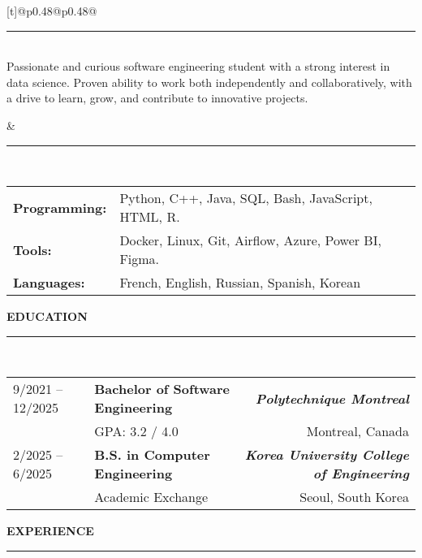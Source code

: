 \documentclass[a4paper,10pt]{article}
\begin{document}
\noindent
\begin{tabularx}{\textwidth}[t]{@{}p{0.48\textwidth}@{\hspace{2em}}p{0.48\textwidth}@{}}
  \parbox[t]{\linewidth}{
    \hspace{5em}\rule{\dimexpr\linewidth-5.3em}{0.4pt} \\[1em]
    Passionate and curious software engineering student with a strong interest in data science. Proven ability to work both independently and collaboratively, with a drive to learn, grow, and contribute to innovative projects.
  }
  &
  \parbox[t]{\linewidth}{
    \hspace{6em}\rule{\dimexpr\linewidth-6.5em}{0.4pt} \\[1em]
    \begin{tabular}{@{}p{2.5cm}p{\dimexpr\linewidth-3.2cm}@{}}
      \textbf{Programming:} & Python, C++, Java, SQL, Bash, JavaScript, HTML, R. \\[1.5em]
      \textbf{Tools:} & Docker, Linux, Git, Airflow, Azure, Power BI, Figma. \\
      \textbf{Languages:} & French, English, Russian, Spanish, Korean
    \end{tabular}
  }
\end{tabularx}

\vspace{0.2em}
\textbf{\large EDUCATION} \hspace{1em}\rule{\dimexpr\linewidth-8em}{0.4pt} \\[0em]

\begin{tabularx}{\textwidth}{@{}p{3cm} X r@{}}
    9/2021 -- 12/2025 & \textbf{Bachelor of Software Engineering} & \textbf{\textit{Polytechnique Montreal}} \\
    & GPA: 3.2 / 4.0 & Montreal, Canada \\[0.5em]
    2/2025 -- 6/2025 & \textbf{B.S. in Computer Engineering} & \textbf{\textit{Korea University College of Engineering}} \\
    & Academic Exchange & Seoul, South Korea &
\end{tabularx}

\vspace{0.2em}
\textbf{\large EXPERIENCE} \hspace{1em}\rule{\dimexpr\linewidth-8em}{0.4pt} \\[0em]
\end{document}
